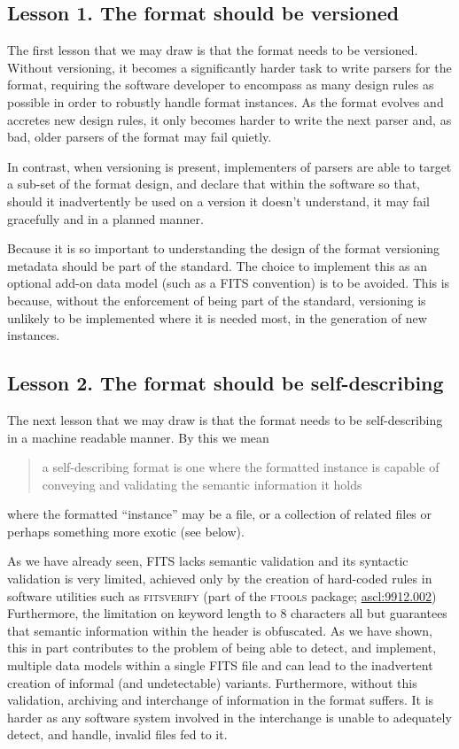 \documentclass[final,authoryear,5p,times,twocolumn]{elsarticle}
\begin{document}
{{\subsection{Lesson 1. The format should be versioned}

The first lesson that we may draw is that the format needs to be
versioned. Without versioning, it becomes a significantly harder
task to write parsers for the format, requiring the software
developer to encompass as many design rules as possible in order
to robustly handle format instances. As the format evolves and
accretes new design rules, it only becomes harder to write the
next parser and, as bad, older parsers of the format may fail quietly.

In contrast, when versioning is present, implementers of parsers
are able to target a sub-set of the format design, and declare
that within the software so that, should it inadvertently be used
on a version it doesn't understand, it may fail gracefully and
in a planned manner.

Because it is so important to understanding the design of
the format versioning metadata should be part of the standard.
The choice to implement this as an optional add-on data model
(such as a FITS convention) is to be avoided. This is because,
without the enforcement of being part of the standard, versioning
is unlikely to be implemented where it is needed most, in the
generation of new instances.


\subsection{Lesson 2. The format should be self-describing}
\label{section_lesson_2}

The next lesson that we may draw is that the format needs to be 
self-describing in a machine readable manner. By this we mean 

\begin{quote}
a self-describing format is one where the formatted instance
is capable of conveying and validating the semantic information 
it holds
\end{quote}

where the formatted ``instance'' may be a file, or a collection 
of related files or perhaps something more exotic (see below). 

As we have already seen, FITS lacks semantic validation and its
syntactic validation is very limited, achieved only by the creation
of hard-coded rules in software utilities such as \textsc{fitsverify}
(part of the \textsc{ftools} package; \href{http://ascl.net/9912.002}{ascl:9912.002})
Furthermore, the limitation on
keyword length to 8 characters all but guarantees that semantic
information within the header is obfuscated. As we have shown,
this in part contributes to the problem of being able to detect,
and implement, multiple data models within a single FITS file
and can lead to the inadvertent creation of informal (and
undetectable) variants. Furthermore, without this validation,
archiving and interchange of information in the format suffers.
It is harder as any software system involved in the interchange
is unable to adequately detect, and handle, invalid files fed to
it.

}}
\end{document}
